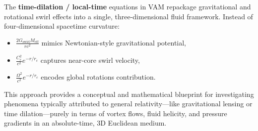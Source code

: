 The \textbf{time-dilation / local-time} equations in VAM repackage gravitational and rotational swirl effects into a single, three-dimensional fluid framework. Instead of four-dimensional spacetime curvature:
\begin{itemize}
    \item \(\tfrac{2 G_\text{swirl} M_\text{eff}}{r c^2}\) mimics Newtonian-style gravitational potential,
    \item \(\tfrac{C_e^2}{c^2} e^{-r/r_c}\) captures near-core swirl velocity,
    \item \(\tfrac{\Omega^2}{c^2} e^{-r/r_c}\) encodes global rotation\rqs s contribution.
\end{itemize}

This approach provides a conceptual and mathematical blueprint for investigating phenomena typically attributed to general relativity—like gravitational lensing or time dilation—purely in terms of vortex flows, fluid helicity, and pressure gradients in an absolute-time, 3D Euclidean medium.